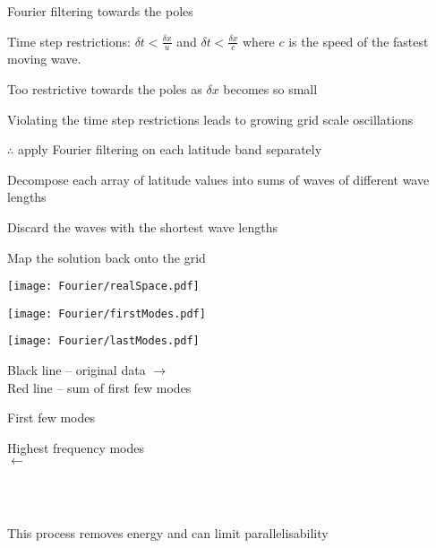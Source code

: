 \begin{slide}

\begin{list1}
\item Fourier filtering towards the poles
\begin{list2}
    \item Time step restrictions: $\delta t < \frac{\delta x}{u}$ and $\delta t < \frac{\delta x}{c}$ where $c$ is the speed of the fastest moving wave.
    \item Too restrictive towards the poles as $\delta x$ becomes so small
    \item Violating the time step restrictions leads to growing grid scale oscillations
    \item $\therefore$ apply Fourier filtering on each latitude band separately
    \begin{list0}
        \item Decompose each array of latitude values into sums of waves of different wave lengths
        \item Discard the waves with the shortest wave lengths
        \item Map the solution back onto the grid
    \end{list0}

\begin{minipage}{0.32\linewidth}
\texttt{[image: Fourier/realSpace.pdf]}
\end{minipage}
%
\begin{minipage}{0.32\linewidth}
\texttt{[image: Fourier/firstModes.pdf]}
\end{minipage}
%
\begin{minipage}{0.32\linewidth}
\texttt{[image: Fourier/lastModes.pdf]}
\end{minipage}

\begin{minipage}[t]{0.38\linewidth}\centering
Black line -- original data $\rightarrow$ \\
Red line -- sum of first few modes
\end{minipage}
%
\begin{minipage}[t]{0.23\linewidth}\centering
First few modes
\end{minipage}
%
\begin{minipage}[t]{0.37\linewidth}\centering
Highest frequency modes \\
$\longleftarrow$
\end{minipage}
\\ \ \\
    \item This process removes energy and can limit parallelisability
\end{list2}
\end{list1}
\end{slide}


